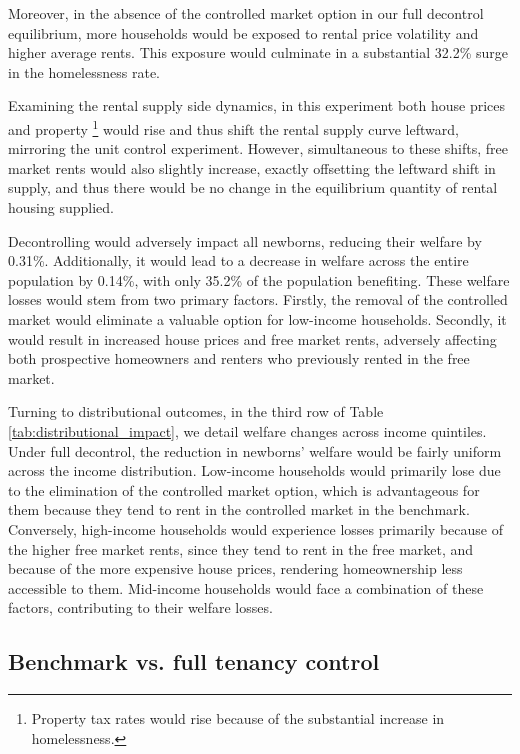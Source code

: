 \documentclass[parskip=full]{article}
\begin{document}
Moreover, in the absence of the controlled market option in our full decontrol equilibrium, more households would be exposed to rental price volatility and higher average rents. This exposure would culminate in a substantial 32.2\% surge in the homelessness rate. 

Examining the rental supply side dynamics, in this experiment both house prices and property \footnote{Property tax rates would rise because of the substantial increase in homelessness.} would rise and thus shift the rental supply curve leftward, mirroring the unit control experiment. However, simultaneous to these shifts, free market rents would also slightly increase, exactly offsetting the leftward shift in supply, and thus there would be no change in the equilibrium quantity of rental housing supplied.

Decontrolling would adversely impact all newborns, reducing their welfare by 0.31\%. Additionally, it would lead to a decrease in welfare across the entire population by 0.14\%, with only 35.2\% of the population benefiting. These welfare losses would stem from two primary factors. Firstly, the removal of the controlled market would eliminate a valuable option for low-income households. Secondly, it would result in increased house prices and free market rents, adversely affecting both prospective homeowners and renters who previously rented in the free market.

Turning to distributional outcomes, in the third row of Table \ref{tab:distributional_impact}, we detail welfare changes across income quintiles. Under full decontrol, the reduction in newborns' welfare would be fairly uniform across the income distribution. Low-income households would primarily lose due to the elimination of the controlled market option, which is advantageous for them because they tend to rent in the controlled market in the benchmark. Conversely, high-income households would experience losses primarily because of the higher free market rents, since they tend to rent in the free market, and because of the more expensive house prices, rendering homeownership less accessible to them. Mid-income households would face a combination of these factors, contributing to their welfare losses.

\subsection{Benchmark vs. full tenancy control}\label{subsection:full_control}
\end{document}
